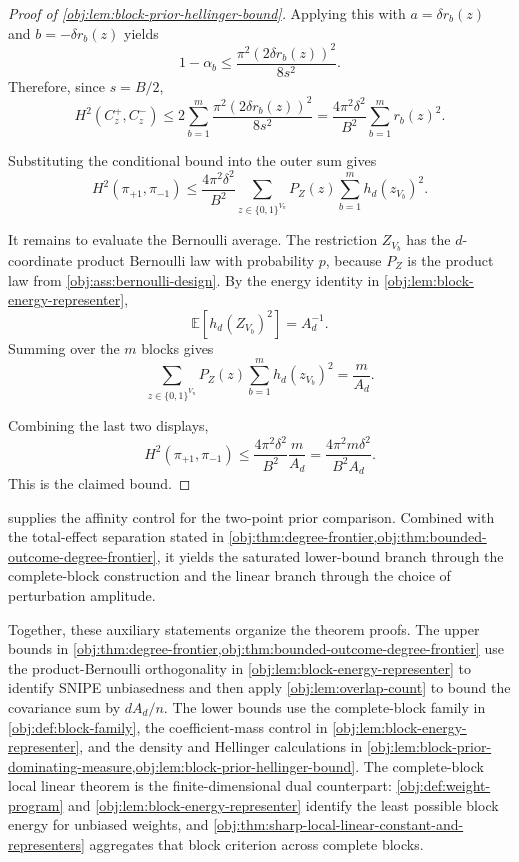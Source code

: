\documentclass[11pt]{article}
\begin{document}
\begin{proof}[Proof of \cref{obj:lem:block-prior-hellinger-bound}]
Applying this with \(a=\delta r_b(z)\) and \(b=-\delta r_b(z)\) yields
\[
1-\alpha_b
\le
\frac{\pi^2(2\delta r_b(z))^2}{8s^2}.
\]
Therefore, since \(s=B/2\),
\[
H^2(C_z^+,C_z^-)
\le
2\sum_{b=1}^{m}
\frac{\pi^2(2\delta r_b(z))^2}{8s^2}
=
\frac{4\pi^2\delta^2}{B^2}
\sum_{b=1}^{m} r_b(z)^2 .
\]

Substituting the conditional bound into the outer sum gives
\[
H^2(\pi_{+1},\pi_{-1})
\le
\frac{4\pi^2\delta^2}{B^2}
\sum_{z\in\{0,1\}^{V_n}}P_Z(z)
\sum_{b=1}^{m}h_d(z_{V_b})^2 .
\]

It remains to evaluate the Bernoulli average.  The restriction \(Z_{V_b}\) has the \(d\)-coordinate product Bernoulli law with probability \(p\), because \(P_Z\) is the product law from \cref{obj:ass:bernoulli-design}.  By the energy identity in \cref{obj:lem:block-energy-representer},
\[
\mathbb E\!\left[h_d(Z_{V_b})^2\right]=A_d^{-1}.
\]
Summing over the \(m\) blocks gives
\[
\sum_{z\in\{0,1\}^{V_n}}P_Z(z)
\sum_{b=1}^{m}h_d(z_{V_b})^2
=
\frac{m}{A_d}.
\]

Combining the last two displays,
\[
H^2(\pi_{+1},\pi_{-1})
\le
\frac{4\pi^2\delta^2}{B^2}\frac{m}{A_d}
=
\frac{4\pi^2m\delta^2}{B^2A_d}.
\]
This is the claimed bound. %
\end{proof}

 supplies the affinity control for the two-point prior comparison. Combined with the total-effect separation stated in \cref{obj:thm:degree-frontier,obj:thm:bounded-outcome-degree-frontier}, it yields the saturated lower-bound branch through the complete-block construction and the linear branch through the choice of perturbation amplitude.

Together, these auxiliary statements organize the theorem proofs. The upper bounds in \cref{obj:thm:degree-frontier,obj:thm:bounded-outcome-degree-frontier} use the product-Bernoulli orthogonality in \cref{obj:lem:block-energy-representer} to identify SNIPE unbiasedness and then apply \cref{obj:lem:overlap-count} to bound the covariance sum by \(dA_d/n\). The lower bounds use the complete-block family in \cref{obj:def:block-family}, the coefficient-mass control in \cref{obj:lem:block-energy-representer}, and the density and Hellinger calculations in \cref{obj:lem:block-prior-dominating-measure,obj:lem:block-prior-hellinger-bound}. The complete-block local linear theorem is the finite-dimensional dual counterpart: \cref{obj:def:weight-program} and \cref{obj:lem:block-energy-representer} identify the least possible block energy for unbiased weights, and \cref{obj:thm:sharp-local-linear-constant-and-representers} aggregates that block criterion across complete blocks.
\end{document}

